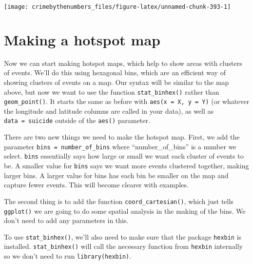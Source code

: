 \documentclass[
]{krantz}
\makeatletter
\newenvironment{Shaded}{\begin{snugshade}}{\end{snugshade}}
\newcommand{\AttributeTok}[1]{\textcolor[rgb]{0.61,0.61,0.61}{#1}}
\newcommand{\FunctionTok}[1]{\textcolor[rgb]{0,0,0}{#1}}
\newcommand{\NormalTok}[1]{#1}
\newcommand{\SpecialCharTok}[1]{\textcolor[rgb]{0,0,0}{#1}}
\newcommand{\StringTok}[1]{\textcolor[rgb]{0.5,0.5,0.5}{#1}}
\newenvironment{kframe}{%
\medskip{}
\setlength{\fboxsep}{.8em}
 \def\at@end@of@kframe{}%
 \ifinner\ifhmode%
  \def\at@end@of@kframe{\end{minipage}}%
  \begin{minipage}{\columnwidth}%
 \fi\fi%
 \def\FrameCommand##1{\hskip\@totalleftmargin \hskip-\fboxsep
 \colorbox{shadecolor}{##1}\hskip-\fboxsep
     \hskip-\linewidth \hskip-\@totalleftmargin \hskip\columnwidth}%
 \MakeFramed {\advance\hsize-\width
   \@totalleftmargin\z@ \linewidth\hsize
   \@setminipage}}%
 {\par\unskip\endMakeFramed%
 \at@end@of@kframe}
\renewenvironment{Shaded}{\begin{kframe}}{\end{kframe}}
\makeatother
\begin{document}
\begin{Shaded}
\end{Shaded}

\begin{center}\texttt{[image: crimebythenumbers\_files/figure-latex/unnamed-chunk-393-1]} \end{center}

\hypertarget{making-a-hotspot-map}{%
\section{Making a hotspot map}\label{making-a-hotspot-map}}

Now we can start making hotspot maps, which help to show
areas with clusters of events. We'll do this using hexagonal
bins, which are an efficient way of showing clusters of
events on a map. Our syntax will be similar to the map
above, but now we want to use the function
\texttt{stat\_binhex()} rather than \texttt{geom\_point()}.
It starts the same as before with
\texttt{aes(x\ =\ X,\ y\ =\ Y)} (or whatever the longitude
and latitude columns are called in your data), as well as
\texttt{data\ =\ suicide} outside of the \texttt{aes()}
parameter.

There are two new things we need to make the hotspot map.
First, we add the parameter
\texttt{bins\ =\ number\_of\_bins} where
``number\_of\_bins'' is a number we select. \texttt{bins}
essentially says how large or small we want each cluster of
events to be. A smaller value for \texttt{bins} says we want
more events clustered together, making larger bins. A larger
value for bins has each bin be smaller on the map and
capture fewer events. This will become clearer with
examples.

The second thing is to add the function
\texttt{coord\_cartesian()}, which just tells
\texttt{ggplot()} we are going to do some spatial analysis
in the making of the bins. We don't need to add any
parameters in this.

To use \texttt{stat\_binhex()}, we'll also need to make sure
that the package \texttt{hexbin} is installed.
\texttt{stat\_binhex()} will call the necessary function
from \texttt{hexbin} internally so we don't need to run
\texttt{library(hexbin)}.
\end{document}
